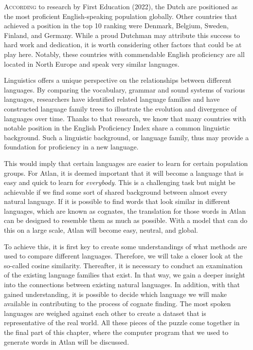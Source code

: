 
\lettrine{A}{ccording} to research by First Education (2022), the Dutch are positioned as the most proficient English-speaking population globally. Other countries that achieved a position in the top 10 ranking were Denmark, Belgium, Sweden, Finland, and Germany. While a proud Dutchman may attribute this success to hard work and dedication, it is worth considering other factors that could be at play here. Notably, these countries with commendable English proficiency are all located in North Europe and speak very similar languages.  

Linguistics offers a unique perspective on the relationships between different languages. By comparing the vocabulary, grammar and sound systems of various languages, researchers have identified related language families and have constructed language family trees to illustrate the evolution and divergence of languages over time. Thanks to that research, we know that many countries with notable position in the English Proficiency Index share a common linguistic background. Such a linguistic background, or language family, thus may provide a foundation for proficiency in a new language. 

This would imply that certain languages are easier to learn for certain population groups. For Atlan, it is deemed important that it will become a language that is easy and quick to learn for \textit{everybody}. This is a challenging task but might be achievable if we find some sort of shared background between almost every natural language. If it is possible to find words that look similar in different languages, which are known as cognates, the translation for those words in Atlan can be designed to resemble them as much as possible. With a model that can do this on a large scale, Atlan will become easy, neutral, and global.  

To achieve this, it is first key to create some understandings of what methods are used to compare different languages. Therefore, we will take a closer look at the so-called cosine similarity. Thereafter, it is necessary to conduct an examination of the existing language families that exist. In that way, we gain a deeper insight into the connections between existing natural languages. In addition, with that gained understanding, it is possible to decide which language we will make available in contributing to the process of cognate finding. The most spoken languages are weighed against each other to create a dataset that is representative of the real world. All these pieces of the puzzle come together in the final part of this chapter, where the computer program that we used to generate words in Atlan will be discussed.

